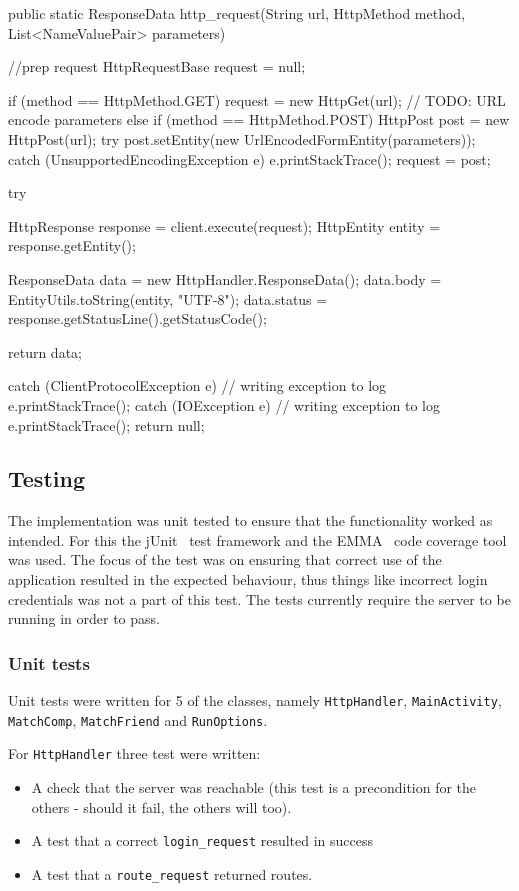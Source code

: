 \begin{code}[label={lst:http-request}, caption={The http-request function}, language=java]    
public static ResponseData http_request(String url, HttpMethod method, List<NameValuePair> parameters) {
	//prep request
	HttpRequestBase request = null;

	if (method == HttpMethod.GET) {
		request = new HttpGet(url);
		// TODO: URL encode parameters
	}
	else if (method == HttpMethod.POST) {
		HttpPost post = new HttpPost(url);
		try {
			post.setEntity(new UrlEncodedFormEntity(parameters));
		}
		catch (UnsupportedEncodingException e) {
			e.printStackTrace();
		}
		request = post;
	}

	try {
		HttpResponse response = client.execute(request);
		HttpEntity entity = response.getEntity();

		ResponseData data = new HttpHandler.ResponseData();
		data.body = EntityUtils.toString(entity, "UTF-8");
		data.status = response.getStatusLine().getStatusCode();

		return data;
	}
	catch (ClientProtocolException e) {
		// writing exception to log
		e.printStackTrace();
	}
	catch (IOException e) {
		// writing exception to log
		e.printStackTrace();
	}
	return null;
}
\end{code}

\subsection{Testing}
The implementation was unit tested to ensure that the functionality worked as intended. For this the jUnit~\citep{junit} test framework and the EMMA~\citep{emma} code coverage tool was used. The focus of the test was on ensuring that correct use of the application resulted in the expected behaviour, thus things like incorrect login credentials was not a part of this test. The tests currently require the server to be running in order to pass.

\subsubsection{Unit tests}
Unit tests were written for 5 of the classes, namely \texttt{Http\-Handler}, \texttt{Main\-Activity}, \texttt{Match\-Comp}, \texttt{Match\-Friend} and \texttt{Run\-Options}. 

For \texttt{HttpHandler} three test were written:

\begin{itemize}
	\item{A check that the server was reachable (this test is a precondition for the others - should it fail, the others will too).}
	\item{A test that a correct \texttt{login\_request} resulted in success }
	\item{A test that a \texttt{route\_request} returned routes.}
\end{itemize}

